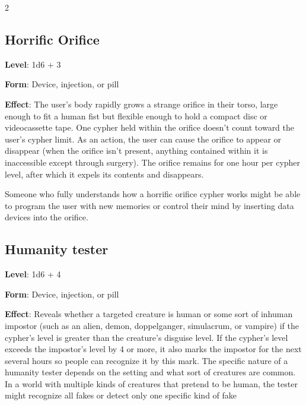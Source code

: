 \begin{multicols}{2}

\subsection{Horrific Orifice}

\textbf{Level}: 1d6 + 3

\textbf{Form}: Device, injection, or pill  

\textbf{Effect}: The user’s body rapidly grows a strange orifice in their torso, large enough to fit a human fist but flexible enough to hold a compact disc or videocassette tape. One cypher held within the orifice doesn’t count toward the user’s cypher limit. As an action, the user can cause the orifice to appear or disappear (when the orifice isn’t present, anything contained within it is inaccessible except through surgery). The orifice remains for one hour per cypher level, after which it expels its contents and disappears.

Someone who fully understands how a horrific orifice cypher works might be able to program the user with new memories or control their mind by inserting data devices into the orifice.

\subsection{Humanity tester}

\textbf{Level}: 1d6 + 4

\textbf{Form}: Device, injection, or pill 

\textbf{Effect}: Reveals whether a targeted creature is human or some sort of inhuman impostor (such as an alien, demon, doppelganger, simulacrum, or vampire) if the cypher’s level is greater than the creature’s disguise level. If the cypher’s level exceeds the impostor’s level by 4 or more,
it also marks the impostor for the next several hours so people can recognize it by this mark.
The specific nature of a humanity tester depends on the setting and what sort of creatures are common. In a world with multiple kinds of creatures that pretend to be human, the tester might recognize all fakes or detect only one specific kind of fake


\end{multicols}
